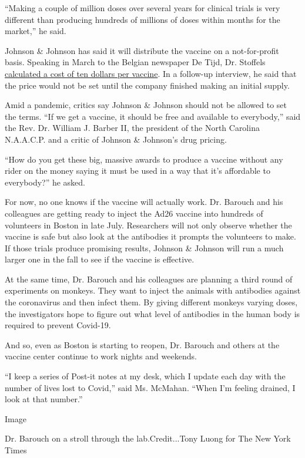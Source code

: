 ``Making a couple of million doses over several years for clinical
trials is very different than producing hundreds of millions of doses
within months for the market,'' he said.

Johnson \& Johnson has said it will distribute the vaccine on a
not-for-profit basis. Speaking in March to the Belgian newspaper De
Tijd, Dr. Stoffels
\href{https://www.tijd.be/ondernemen/farma-biotech/we-rekenen-op-een-vaccin-van-10-euro-tegen-coronavirus/10217795.html}{calculated
a cost of ten dollars per vaccine}. In a follow-up interview, he said
that the price would not be set until the company finished making an
initial supply.

Amid a pandemic, critics say Johnson \& Johnson should not be allowed to
set the terms. ``If we get a vaccine, it should be free and available to
everybody,'' said the Rev. Dr. William J. Barber II, the president of
the North Carolina N.A.A.C.P. and a critic of Johnson \& Johnson's drug
pricing.

``How do you get these big, massive awards to produce a vaccine without
any rider on the money saying it must be used in a way that it's
affordable to everybody?'' he asked.

For now, no one knows if the vaccine will actually work. Dr. Barouch and
his colleagues are getting ready to inject the Ad26 vaccine into
hundreds of volunteers in Boston in late July. Researchers will not only
observe whether the vaccine is safe but also look at the antibodies it
prompts the volunteers to make. If those trials produce promising
results, Johnson \& Johnson will run a much larger one in the fall to
see if the vaccine is effective.

At the same time, Dr. Barouch and his colleagues are planning a third
round of experiments on monkeys. They want to inject the animals with
antibodies against the coronavirus and then infect them. By giving
different monkeys varying doses, the investigators hope to figure out
what level of antibodies in the human body is required to prevent
Covid-19.

And so, even as Boston is starting to reopen, Dr. Barouch and others at
the vaccine center continue to work nights and weekends.

``I keep a series of Post-it notes at my desk, which I update each day
with the number of lives lost to Covid,'' said Ms. McMahan. ``When I'm
feeling drained, I look at that number.''

Image

Dr. Barouch on a stroll through the lab.Credit...Tony Luong for The New
York Times

